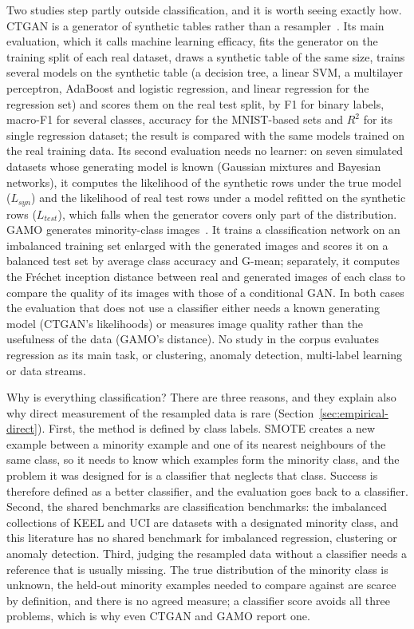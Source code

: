 Two studies step partly outside classification, and it is worth seeing exactly how. CTGAN is a generator of synthetic tables rather than a resampler~\parencite{xu2019ctgan}. Its main evaluation, which it calls machine learning efficacy, fits the generator on the training split of each real dataset, draws a synthetic table of the same size, trains several models on the synthetic table (a decision tree, a linear SVM, a multilayer perceptron, AdaBoost and logistic regression, and linear regression for the regression set) and scores them on the real test split, by F1 for binary labels, macro-F1 for several classes, accuracy for the MNIST-based sets and $R^2$ for its single regression dataset; the result is compared with the same models trained on the real training data. Its second evaluation needs no learner: on seven simulated datasets whose generating model is known (Gaussian mixtures and Bayesian networks), it computes the likelihood of the synthetic rows under the true model ($L_{syn}$) and the likelihood of real test rows under a model refitted on the synthetic rows ($L_{test}$), which falls when the generator covers only part of the distribution. GAMO generates minority-class images~\parencite{mullick2019gamo}. It trains a classification network on an imbalanced training set enlarged with the generated images and scores it on a balanced test set by average class accuracy and G-mean; separately, it computes the Fréchet inception distance between real and generated images of each class to compare the quality of its images with those of a conditional GAN. In both cases the evaluation that does not use a classifier either needs a known generating model (CTGAN's likelihoods) or measures image quality rather than the usefulness of the data (GAMO's distance). No study in the corpus evaluates regression as its main task, or clustering, anomaly detection, multi-label learning or data streams.

Why is everything classification? There are three reasons, and they explain also why direct measurement of the resampled data is rare (Section~\ref{sec:empirical-direct}). First, the method is defined by class labels. SMOTE creates a new example between a minority example and one of its nearest neighbours of the same class, so it needs to know which examples form the minority class, and the problem it was designed for is a classifier that neglects that class. Success is therefore defined as a better classifier, and the evaluation goes back to a classifier. Second, the shared benchmarks are classification benchmarks: the imbalanced collections of KEEL and UCI are datasets with a designated minority class, and this literature has no shared benchmark for imbalanced regression, clustering or anomaly detection. Third, judging the resampled data without a classifier needs a reference that is usually missing. The true distribution of the minority class is unknown, the held-out minority examples needed to compare against are scarce by definition, and there is no agreed measure; a classifier score avoids all three problems, which is why even CTGAN and GAMO report one.

